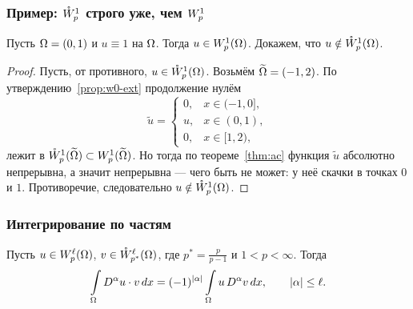\subsubsection*{Пример: $\mathring{W}_{p}^{1}$ строго уже, чем $W_{p}^{1}$}

\begin{example}
Пусть $\Omega = (0,1)$ и $u \equiv 1$ на $\Omega$. Тогда $u \in W_{p}^{1}(\Omega)$. Докажем,
что $u \notin \mathring{W}_{p}^{1}(\Omega)$.
\end{example}


\begin{proof}
Пусть, от противного, $u \in \mathring{W}_{p}^{1}(\Omega)$. Возьмём $\widetilde{\Omega} = (-1,2)$. По
утверждению~\ref{prop:w0-ext} продолжение нулём
\[
  \widetilde u = \begin{cases}
    0, & x \in (-1, 0], \\
    u, & x \in (0, 1), \\
    0, & x \in [1, 2),
  \end{cases}
\]
лежит в $\mathring{W}_{p}^{1}(\widetilde{\Omega}) \subset W_{p}^{1}(\widetilde{\Omega})$. Но тогда по
теореме~\ref{thm:ac} функция $\widetilde u$ абсолютно непрерывна, а значит непрерывна —
чего быть не может: у неё скачки в точках $0$ и $1$. Противоречие, следовательно
$u \notin \mathring{W}_{p}^{1}(\Omega)$.
\end{proof}

\subsubsection*{Интегрирование по частям}

\begin{theorem}\label{thm:parts}
Пусть $u \in W_{p}^{\ell}(\Omega)$, $v \in \mathring{W}_{p^*}^{\ell}(\Omega)$, где
$p^* = \frac{p}{p-1}$ и $1 < p < \infty$. Тогда
\[
  \int\limits_\Omega D^\alpha u \cdot v\, dx
  = (-1)^{|\alpha|} \int\limits_\Omega u\, D^\alpha v\, dx ,
  \qquad |\alpha| \le \ell .
\]
\end{theorem}

